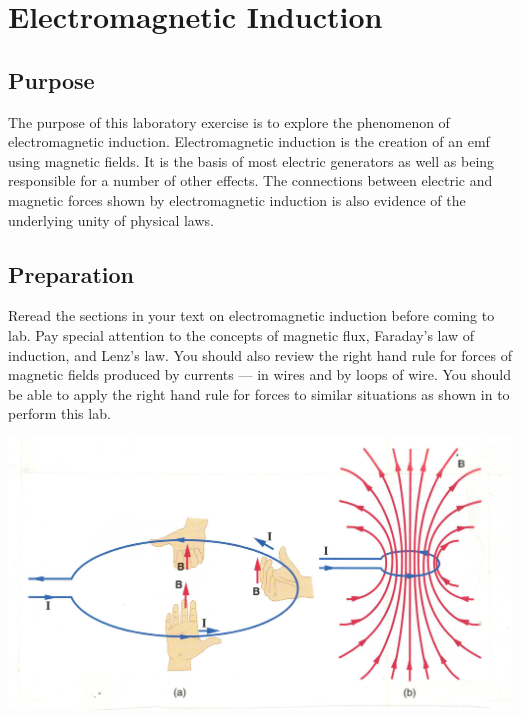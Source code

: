 \chapter{Electromagnetic Induction}

\begin{multicols}{2}
\section{Purpose}
The purpose of this laboratory exercise is to explore the phenomenon of electromagnetic induction.  Electromagnetic induction is the creation of an emf using magnetic fields.  It is the basis of most electric generators as well as being responsible for a number of other effects.  The connections between electric and magnetic forces shown by electromagnetic induction is also evidence of the underlying unity of physical laws.

\section{Preparation}
Reread the sections in your text on electromagnetic induction before coming to lab. Pay special attention to the concepts of magnetic flux, Faraday's law of induction, and Lenz's law.  You should also review the \textsf{right hand rule for forces} of magnetic fields produced by currents --- in wires and by loops of wire.  You should be able to apply the \textsf{right hand rule for forces} to similar situations as shown in  to perform this lab.



\begin{center}
	\includegraphics[scale=0.6]{5bgraf/fig_11}
	\label{f:fig11}
\end{center}


\end{multicols}
